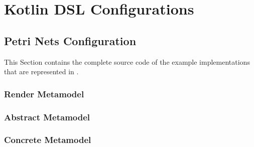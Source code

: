 
 



\chapter{Kotlin DSL Configurations}
\section{Petri Nets Configuration}

This Section contains the complete source code of the example implementations that are represented in .
\label{app:petri}
\subsection*{Render Metamodel}


\subsection*{Abstract Metamodel}


\subsection*{Concrete Metamodel}
\raggedbottom


